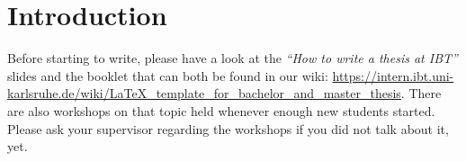 \chapter{Introduction}
\label{chap:introduction}

Before starting to write, please have a look at the \textit{``How to write a thesis at IBT''} slides and the booklet that can both be found in our wiki: \url{https://intern.ibt.uni-karlsruhe.de/wiki/LaTeX_template_for_bachelor_and_master_thesis}.
There are also workshops on that topic held whenever enough new students started. Please ask your supervisor regarding the workshops if you did not talk about it, yet.\\

